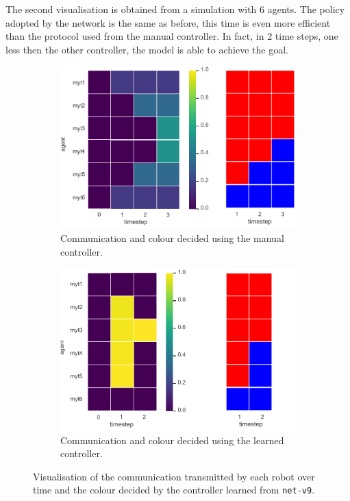 The second visualisation is obtained from a simulation with 6 agents. 
The policy adopted by the network is the same as before, this time is even more 
efficient than the protocol used from the manual controller. In fact, in 2 time 
steps, one less then the other controller, the model is able to achieve the goal.
\begin{figure}[!htb]
	\begin{subfigure}[h]{\textwidth}
		\centering
		\includegraphics[width=.55\textwidth]{contents/images/net-v9/net-v9-manual-1}
		\caption{Communication and colour decided using the manual controller.}
	\end{subfigure}
	\hspace*{\fill}%
	\vspace*{8pt}%
	\hspace*{\fill}%
	\begin{subfigure}[h]{\textwidth}
		\centering			
		\includegraphics[width=.55\textwidth]{contents/images/net-v9/net-v9-learned-1}
		\caption{Communication and colour decided using the learned controller.}
	\end{subfigure}
	\caption[Evaluation of the communication learned by 
	\texttt{net-v9}.]{Visualisation of the communication transmitted by each 
		robot over time and the colour decided by the controller learned from 
		\texttt{net-v9}.}	
	\label{fig:net-v9commcolour2}
\end{figure}

